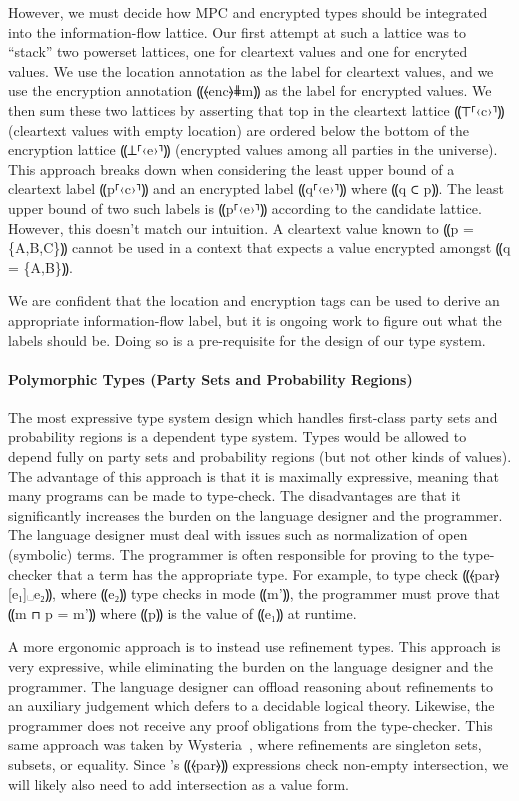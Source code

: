 However, we must decide how MPC and encrypted types should be integrated into
the information-flow lattice. Our first attempt at such a lattice was to ``stack''
two powerset lattices, one for cleartext values and one for encryted values. We
use the location annotation as the label for cleartext values, and we use the
encryption annotation ⸨⦑enc⦒⋕m⸩ as the label for encrypted values. We then
sum these two lattices by asserting that top in the cleartext lattice ⸨⊤⸢‹c›⸣⸩
(cleartext values with empty location) are ordered below the bottom of the
encryption lattice ⸨⊥⸢‹e›⸣⸩ (encrypted values among all parties in the universe).
This approach breaks down when considering the least upper bound of a cleartext
label ⸨p⸢‹c›⸣⸩ and an encrypted label ⸨q⸢‹e›⸣⸩ where ⸨q ⊂ p⸩. The least upper
bound of two such labels is ⸨p⸢‹e›⸣⸩ according to the candidate lattice. However,
this doesn't match our intuition. A cleartext value known to ⸨p = \{A,B,C\}⸩ cannot
be used in a context that expects a value encrypted amongst ⸨q = \{A,B\}⸩.

We are confident that the location and encryption tags can be used to derive an appropriate
information-flow label, but it is ongoing work to figure out what the labels should be. Doing
so is a pre-requisite for the design of our type system.

\paragraph*{Polymorphic Types (Party Sets and Probability Regions)}

The most expressive type system design which handles first-class party sets
and probability regions is a dependent type system. Types would be allowed to
depend fully on party sets and probability regions (but not other kinds of values).
The advantage of this approach is that it is maximally expressive, meaning that
many programs can be made to type-check. The disadvantages are that it significantly
increases the burden on the language designer and the programmer. The language designer
must deal with issues such as normalization of open (symbolic) terms. The programmer
is often responsible for proving to the type-checker that a term has the appropriate type.
For example, to type check ⸨⦑par⦒[e₁]␣e₂⸩, where ⸨e₂⸩ type checks in mode ⸨m'⸩, the
programmer must prove that ⸨m ⊓ p = m'⸩ where ⸨p⸩ is the value of ⸨e₁⸩ at runtime.

A more ergonomic approach is to instead use refinement types. This approach is very expressive,
while eliminating the burden on the language designer and the programmer. The language
designer can offload reasoning about refinements to an auxiliary judgement which defers to
a decidable logical theory. Likewise, the programmer does not receive any proof obligations from
the type-checker. This same approach was taken by Wysteria~\cite{rastogi14wysteria},
where refinements are singleton sets, subsets, or equality. Since \lang's ⸨⦑par⦒⸩ expressions
check non-empty intersection, we will likely also need to add intersection as a value form.

